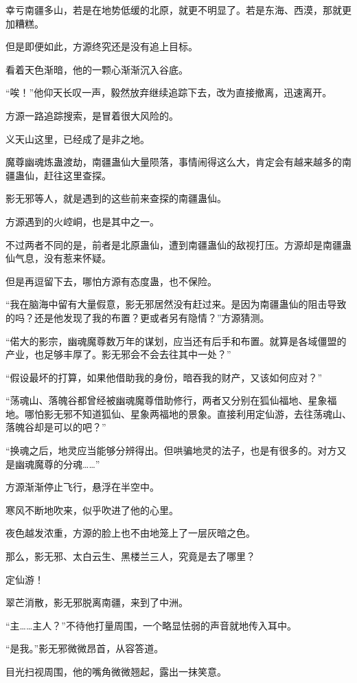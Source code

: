 \begin{this_body}
幸亏南疆多山，若是在地势低缓的北原，就更不明显了。若是东海、西漠，那就更加糟糕。

但是即便如此，方源终究还是没有追上目标。

看着天色渐暗，他的一颗心渐渐沉入谷底。

“唉！”他仰天长叹一声，毅然放弃继续追踪下去，改为直接撤离，迅速离开。

方源一路追踪搜索，是冒着很大风险的。

义天山这里，已经成了是非之地。

魔尊幽魂炼蛊渡劫，南疆蛊仙大量陨落，事情闹得这么大，肯定会有越来越多的南疆蛊仙，赶往这里查探。

影无邪等人，就是遇到的这些前来查探的南疆蛊仙。

方源遇到的火崆峒，也是其中之一。

不过两者不同的是，前者是北原蛊仙，遭到南疆蛊仙的敌视打压。方源却是南疆蛊仙气息，没有惹来怀疑。

但是再逗留下去，哪怕方源有态度蛊，也不保险。

“我在脑海中留有大量假意，影无邪居然没有赶过来。是因为南疆蛊仙的阻击导致的吗？还是他发现了我的布置？更或者另有隐情？”方源猜测。

“偌大的影宗，幽魂魔尊数万年的谋划，应当还有后手和布置。就算是各域僵盟的产业，也足够丰厚了。影无邪会不会去往其中一处？”

“假设最坏的打算，如果他借助我的身份，暗吞我的财产，又该如何应对？”

“荡魂山、落魄谷都曾经被幽魂魔尊借助修行，两者又分别在狐仙福地、星象福地。哪怕影无邪不知道狐仙、星象两福地的景象。直接利用定仙游，去往荡魂山、落魄谷却是可以的吧？”

“换魂之后，地灵应当能够分辨得出。但哄骗地灵的法子，也是有很多的。对方又是幽魂魔尊的分魂……”

方源渐渐停止飞行，悬浮在半空中。

寒风不断地吹来，似乎吹进了他的心里。

夜色越发浓重，方源的脸上也不由地笼上了一层灰暗之色。

那么，影无邪、太白云生、黑楼兰三人，究竟是去了哪里？

定仙游！

翠芒消散，影无邪脱离南疆，来到了中洲。

“主……主人？”不待他打量周围，一个略显怯弱的声音就地传入耳中。

“是我。”影无邪微微昂首，从容答道。

目光扫视周围，他的嘴角微微翘起，露出一抹笑意。

\end{this_body}


